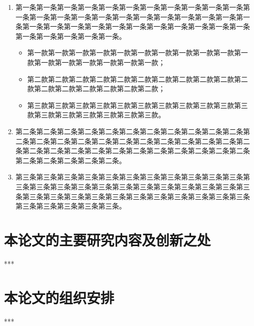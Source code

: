 \begin{enumerate}
	\item 第一条第一条第一条第一条第一条第一条第一条第一条第一条第一条第一条第一条第一条第一条第一条第一条第一条第一条第一条第一条第一条第一条第一条第一条第一条第一条第一条第一条第一条第一条第一条第一条第一条第一条第一条第一条第一条第一条第一条。
	\begin{itemize}[itemsep=0ex,partopsep=0pt,parsep=0ex,topsep=6bp,labelsep=10pt]
		\item 第一款第一款第一款第一款第一款第一款第一款第一款第一款第一款第一款第一款第一款第一款第一款第一款第一款；
		\item 第二款第二款第二款第二款第二款第二款第二款第二款第二款第二款第二款第二款第二款第二款第二款第二款第二款；
		\item 第三款第三款第三款第三款第三款第三款第三款第三款第三款第三款第三款第三款第三款第三款第三款第三款第三款。
	\end{itemize}
	\item 第二条第二条第二条第二条第二条第二条第二条第二条第二条第二条第二条第二条第二条第二条第二条第二条第二条第二条第二条第二条第二条第二条第二条第二条第二条第二条第二条第二条第二条第二条第二条第二条第二条第二条第二条第二条第二条第二条第二条。
	\item 第三条第三条第三条第三条第三条第三条第三条第三条第三条第三条第三条第三条第三条第三条第三条第三条第三条第三条第三条第三条第三条第三条第三条第三条第三条第三条第三条第三条第三条第三条第三条第三条第三条第三条第三条第三条第三条第三条第三条。
\end{enumerate}

\section{本论文的主要研究内容及创新之处}
***

\section{本论文的组织安排}
***
